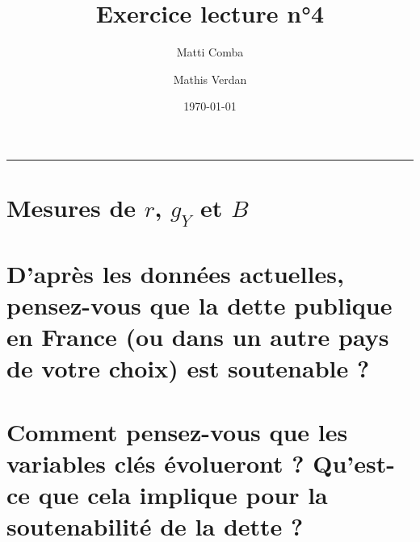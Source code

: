 \documentclass{article}
\title{\Huge \textbf{Exercice lecture n°4}}
\author{Matti Comba \and Mathis Verdan}
\date{\today}
\begin{document}
\maketitle
\begin{center}
  \rule{\linewidth}{0.5mm}
\end{center}


\section{Mesures de $r$, $g_Y$ et $B$}


\section{D’après les données actuelles, pensez-vous que la dette publique en France (ou dans un autre pays
de votre choix) est soutenable ?
}

\section{Comment pensez-vous que les variables clés évolueront ? Qu’est-ce que cela implique pour la
soutenabilité de la dette ?}
\end{document}
